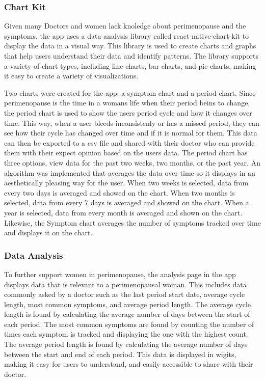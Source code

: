 \subsubsection{Chart Kit}
Given many Doctors and women lack knoledge about perimenopause and the symptoms, the app uses a data analysis library called react-native-chart-kit to display the data in a visual way. This library is used to create charts and graphs that help users understand their data and identify patterns. The library supports a variety of chart types, including line charts, bar charts, and pie charts, making it easy to create a variety of visualizations. 

Two charts were created for the app: a symptom chart and a period chart. Since perimenopause is the time in a womans life when their period beins to change, the period chart is used to show the users period cycle and how it changes over time. This way, when a user bleeds inconsistenly or has a missed period, they can see how their cycle has changed over time and if it is normal for them. This data can then be exported to a csv file and shared with their doctor who can provide them with their expect opinion based on the users data. The period chart has three options, view data for the past two weeks, two months, or the past year. An algorithm was implemented that averages the data over time so it displays in an aesthetically pleasing way for the user. When two weeks is selected, data from every two days is averaged and showed on the chart. When two months is selected, data from every 7 days is averaged and showed on the chart. When a year is selected, data from every month is averaged and shown on the chart. Likewise, the Symptom chart averages the number of symptoms tracked over time and displays it on the chart. 

\subsubsection{Data Analysis}
To further support women in perimenopause, the analysis page in the app displays data that is relevant to a perimenopausal woman. This includes data commonly asked by a doctor such as the last period start date, average cycle length, most common symptoms, and average period length. The average cycle length is found by calculating the average number of days between the start of each period. The most common symptoms are found by counting the number of times each symptom is tracked and displaying the one with the highest count. The average period length is found by calculating the average number of days between the start and end of each period. This data is displayed in wigits, making it easy for users to understand, and easily accessible to share with their doctor.

